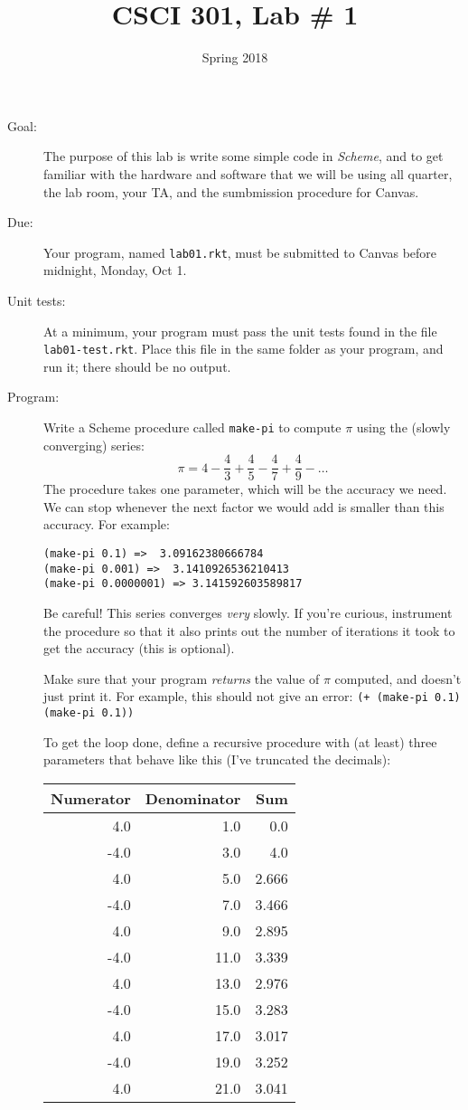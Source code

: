 \documentclass{article}
\title{CSCI 301, Lab \# 1}
\author{Spring 2018}
\date{}
\begin{document}
\maketitle
\begin{multicols}{2}

\begin{description}
\item[Goal:] The purpose of this lab is write some simple code in {\em
  Scheme}, and to get familiar with the hardware and software that we
  will be using all quarter, the lab room, your TA, and the
  sumbmission procedure for Canvas.

\item[Due:] Your program, named {\tt lab01.rkt}, must be submitted to
  Canvas before midnight, Monday, Oct 1.

  \item[Unit tests:]
  At a minimum, your program must pass the unit tests found in the
  file {\tt lab01-test.rkt}.  Place this file in the same folder
  as your program, and run it;  there should be no output.

\item[Program:] Write a {\sc Scheme} procedure called {\tt make-pi} 
to compute $\pi$
  using the (slowly converging) series:
\[
{\pi} = 4 - \frac43 + \frac45 - \frac47 + \frac49 - \ldots
\]
The procedure takes one parameter, which will be the 
accuracy we need.  We can stop whenever the next factor we would
add is smaller than this accuracy.  For example:
\begin{Verbatim}[frame=single]
(make-pi 0.1) =>  3.09162380666784
(make-pi 0.001) =>  3.1410926536210413
(make-pi 0.0000001) => 3.141592603589817
\end{Verbatim}
Be careful!  This series converges {\em very} slowly.  If you're
curious, instrument the procedure so that it also prints out the
number of iterations it took to get the accuracy (this is optional).

Make sure that your program {\em returns} the value of $\pi$ computed,
and doesn't just print it.  For example, this should not give an
error: \verb|(+ (make-pi 0.1) (make-pi 0.1))|


To get the loop done, define a recursive procedure with (at least)
three
parameters that behave like this (I've truncated the decimals):\\
\begin{tabular}{rrr}
 Numerator & Denominator & Sum \\\hline
 4.0 & 1.0 & 0.0\\
 -4.0 & 3.0 & 4.0\\
 4.0 & 5.0 & 2.666\\
 -4.0 & 7.0 & 3.466\\
 4.0 & 9.0 & 2.895\\
 -4.0 & 11.0 & 3.339\\
 4.0 & 13.0 & 2.976\\
 -4.0 & 15.0 & 3.283\\
 4.0 & 17.0 & 3.017\\
 -4.0 & 19.0 & 3.252\\
 4.0 & 21.0 & 3.041\\
\end{tabular}


\end{description}
\end{multicols}
\end{document}
